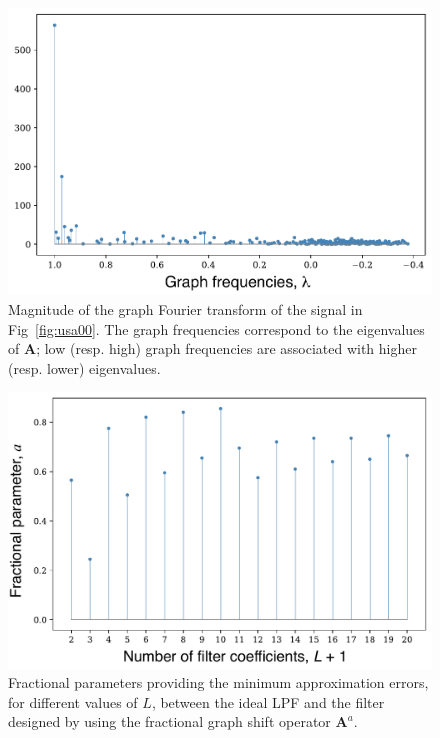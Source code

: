 \begin{figure}[ht!]%
	\centering
\includegraphics[width=0.5\linewidth]{Figures/GNorm_estacoes_GFT_Temperatura.pdf}%
	\caption{Magnitude of the graph Fourier transform of the signal in Fig~\ref{fig:usa00}. The graph frequencies correspond to the eigenvalues of $\mathbf{A}$; low (resp. high) graph frequencies are associated with higher (resp. lower) eigenvalues.}%
	\label{fig:usa01}%
\end{figure}

\begin{figure}[ht!]
	\centering
\includegraphics[width=0.5\linewidth]{Figures/ERROR_ordens_fracionarias.pdf}
	\caption{Fractional parameters providing the minimum approximation errors, for different values of $L$, between the ideal LPF and the filter designed by using the fractional graph shift operator $\mathbf{A}^a$.}%
	\label{fig:usa02}%
\end{figure}

